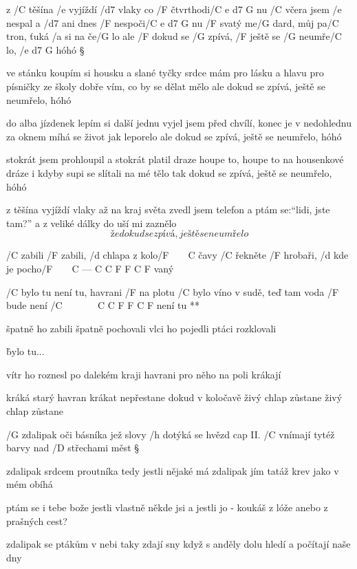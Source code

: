 z /C těšína /e vyjíždí /d7 vlaky co /F čtvrthodi/{C e d7 G} nu
/C včera jsem /e nespal a /d7 ani dnes /F nespoči/{C e d7 G} nu
/F svatý me/G dard, můj pa/C tron, ťuká /a si na če/G lo
ale /F dokud se /G zpívá, /F ještě se /G neumře/C lo, /{e d7 G} hóhó \S

ve stánku koupím si housku a slané tyčky
srdce mám pro lásku a hlavu pro písničky
ze školy dobře vím, co by se dělat mělo
ale dokud se zpívá, ještě se neumřelo, hóhó \s

do alba jízdenek lepím si další jednu
vyjel jsem před chvílí, konec je v nedohlednu
za oknem míhá se život jak leporelo
ale dokud se zpívá, ještě se neumřelo, hóhó \s

stokrát jsem prohloupil a stokrát platil draze
houpe to, houpe to na housenkové dráze
i kdyby supi se slítali na mé tělo
tak dokud se zpívá, ještě se neumřelo, hóhó \s

z těšína vyjíždí vlaky až na kraj světa
zvedl jsem telefon a ptám se:``lidi, jste tam?''
a z veliké dálky do uší mi zaznělo
\[ že dokud se zpívá, ještě se neumřelo \]




/C zabili /F zabili, /d chlapa z kolo/{F~~~~C} čavy
/C řekněte /F hrobaři, /d kde je pocho/{F~~~~C --- C C F F C F} vaný

\R  /C bylo tu není tu, havrani /F na plotu
    /C bylo víno v sudě, teď tam voda /F bude
    není /{C ~~~~~~ C C F F C F} není tu **

špatně ho zabili špatně pochovali
vlci ho pojedli ptáci rozklovali

\r bylo tu...

vítr ho roznesl po dalekém kraji
havrani pro něho na poli krákají

\rr

kráká starý havran krákat nepřestane
dokud v koločavě živý chlap zůstane
živý chlap zůstane




/G zdalipak oči básníka jež slovy /h dotýká se hvězd \hfill cap II.
/C vnímají tytéž barvy nad /D střechami měst \S

zdalipak srdcem proutníka tedy jestli nějaké má
zdalipak jím tatáž krev jako v mém obíhá \s

ptám se i tebe bože jestli vlastně někde jsi
a jestli jo - koukáš z lóže anebo z prašných cest? \s

zdalipak se ptákům v nebi taky zdají sny
když s anděly dolu hledí a počítají naše dny \s

